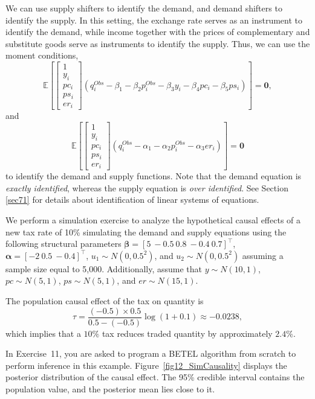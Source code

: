We can use supply shifters to identify the demand, and demand shifters to identify the supply. In this setting, the exchange rate serves as an instrument to identify the demand, while income together with the prices of complementary and substitute goods serve as instruments to identify the supply. Thus, we can use the moment conditions,
\[
\mathbb{E}\left[\begin{bmatrix}
	1\\
	y_i\\
	pc_i\\
	ps_i\\
	er_i
\end{bmatrix}(q_i^{Obs}-\beta_1-\beta_2p_i^{Obs}-\beta_3y_i-\beta_4pc_i-\beta_5ps_i)\right]=\mathbf{0},
\] 
and 
\[
\mathbb{E}\left[\begin{bmatrix}
	1\\
	y_i\\
	pc_i\\
	ps_i\\
	er_i
\end{bmatrix}(q_i^{Obs}-\alpha_1-\alpha_2p_i^{Obs}-\alpha_3er_i)\right]=\mathbf{0}
\]
to identify the demand and supply functions. Note that the demand equation is \textit{exactly identified}, whereas the supply equation is \textit{over identified}. See Section \ref{sec71} for details about identification of linear systems of equations.

We perform a simulation exercise to analyze the hypothetical causal effects of a new tax rate of 10\% simulating the demand and supply equations using the following structural parameters $\bm{\beta} = \left[ 5 \ -0.5 \ 0.8 \ -0.4 \ 0.7 \right]^{\top}$, $\bm{\alpha} = \left[ -2 \ 0.5 \ -0.4 \right]^{\top}$, $u_1 \sim N(0, 0.5^2)$, and $u_2 \sim N(0, 0.5^2)$ assuming a sample size equal to 5,000. Additionally, assume that $y \sim N(10, 1)$, $pc \sim N(5, 1)$, $ps \sim N(5, 1)$, and $er \sim N(15, 1)$. 

The population causal effect of the tax on quantity is
\[
\tau=\frac{(-0.5)\times 0.5}{0.5-(-0.5)}\log(1+0.1)\approx -0.0238,
\]
which implies that a \(10\%\) tax reduces traded quantity by approximately \(2.4\%\).

In Exercise~11, you are asked to program a BETEL algorithm from scratch to perform inference in this example. Figure~\ref{fig12_SimCausality} displays the posterior distribution of the causal effect. The 95\% credible interval contains the population value, and the posterior mean lies close to it.

